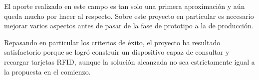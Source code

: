 \documentclass[%
        final,
        notitlepage,
        narroweqnarray,
        inline,
        ]{ieee}
\begin{document}
El aporte realizado en este campo es tan solo una primera aproximación y aún 
queda mucho por hacer al respecto. Sobre este proyecto en particular es
necesario mejorar varios aspectos antes de pasar de la fase de prototipo
a la de producción.


Repasando en particular los criterios de éxito, el proyecto ha resultado satisfactorio
porque se logró construir un dispositivo capaz de consultar y recargar tarjetas RFID,
aunque la solución alcanzada no sea estrictamente igual a la propuesta en el comienzo.




%




\end{document}
